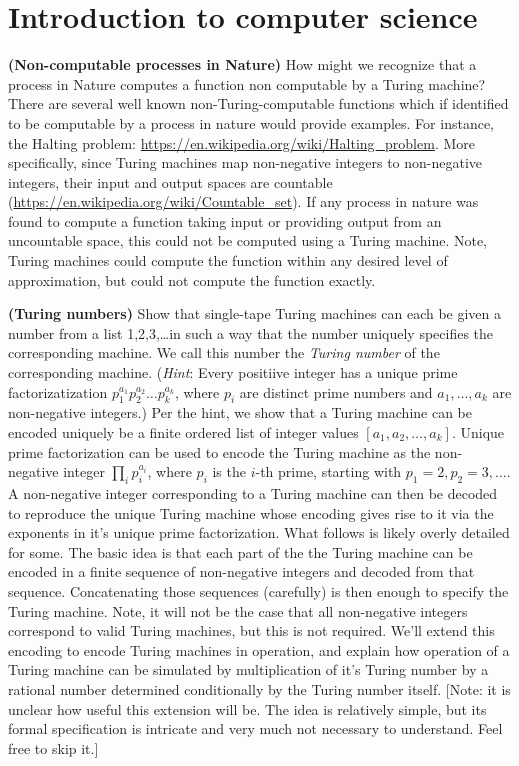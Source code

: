 
\chapter{Introduction to computer science}
 \textbf{(Non-computable processes in Nature)} How might we recognize that a process in Nature computes a function non computable by a Turing machine?
\Soln There are several well known non-Turing-computable functions which if identified to be computable by a process in nature would provide examples.  For instance, the Halting problem: \url{https://en.wikipedia.org/wiki/Halting_problem}.   More specifically, since Turing machines map non-negative integers to non-negative integers, their input and output spaces are countable (\url{https://en.wikipedia.org/wiki/Countable_set}).  If any process in nature was found to compute a function taking input or providing output from an uncountable space, this could not be computed using a Turing machine.  Note, Turing machines could compute the function within any desired level of approximation, but could not compute the function exactly.

 \textbf{(Turing numbers)}  Show that single-tape Turing machines can each be given a number from a list 1,2,3,\ldots in such a way that the number uniquely specifies the corresponding machine.  We call this number the \textit{Turing number} of the corresponding machine.  (\textit{Hint}:  Every positiive integer has a unique prime factorizatization $p_1^{a_1}p_2^{a_2}\ldots p_k^{a_k}$, where $p_i$ are distinct prime numbers and $a_1,\ldots, a_k$ are non-negative integers.)
\Soln Per the hint, we show that a Turing machine can be encoded uniquely be a finite ordered list of integer values $[a_1, a_2, \ldots, a_k]$.  Unique prime factorization can be used to encode the Turing machine as the non-negative integer $\prod_i p_i^{a_i}$, where $p_i$ is the $i$-th prime, starting with $p_1 = 2, p_2 = 3,\ldots$. A non-negative integer corresponding to a Turing machine can then be decoded to reproduce the unique Turing machine whose encoding gives rise to it via the exponents in it's unique prime factorization. What follows is likely overly detailed for some.  The basic idea is that each part of the the Turing machine can be encoded in a finite sequence of non-negative integers and decoded from that sequence.  Concatenating those sequences (carefully) is then enough to specify the Turing machine.  Note, it will not be the case that all non-negative integers correspond to valid Turing machines, but this is not required.  We'll extend this encoding to encode Turing machines in operation, and explain how operation of a Turing machine can be simulated by multiplication of it's Turing number by a rational number determined conditionally by the Turing number itself.  [Note: it is unclear how useful this extension will be. The idea is relatively simple, but its formal specification is intricate and very much not necessary to understand.  Feel free to skip it.] 

